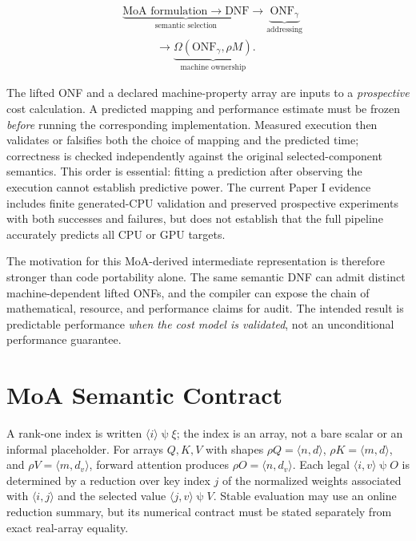 \documentclass[sigplan,10pt,review,balance=false,pbalance=false]{acmart}
\newcommand{\ps}{\mathbin{\psi}}
\begin{document}
\begin{equation}\label{eq:research-chain}
\begin{aligned}
&\underbrace{\text{MoA formulation}\longrightarrow\mathrm{DNF}}_{\text{semantic selection}}
\longrightarrow\underbrace{\mathrm{ONF}_{\gamma}}_{\text{addressing}}\\
&\hspace{3em}\longrightarrow\underbrace{\Omega(\mathrm{ONF}_{\gamma},\rho M)}_{\text{machine ownership}}.
\end{aligned}
\end{equation}

The lifted ONF and a declared machine-property array are inputs to a \emph{prospective} cost calculation. A predicted mapping and performance estimate must be frozen \emph{before} running the corresponding implementation. Measured execution then validates or falsifies both the choice of mapping and the predicted time; correctness is checked independently against the original selected-component semantics. This order is essential: fitting a prediction after observing the execution cannot establish predictive power. The current Paper I evidence includes finite generated-CPU validation and preserved prospective experiments with both successes and failures, but does not establish that the full pipeline accurately predicts all CPU or GPU targets.

The motivation for this MoA-derived intermediate representation is therefore stronger than code portability alone. The same semantic DNF can admit distinct machine-dependent lifted ONFs, and the compiler can expose the chain of mathematical, resource, and performance claims for audit. The intended result is predictable performance \emph{when the cost model is validated}, not an unconditional performance guarantee.

\section{MoA Semantic Contract}
A rank-one index is written $\langle i\rangle\ps\xi$; the index is an array, not a bare scalar or an informal placeholder. For arrays $Q,K,V$ with shapes $\rho Q=\langle n,d\rangle$, $\rho K=\langle m,d\rangle$, and $\rho V=\langle m,d_v\rangle$, forward attention produces $\rho O=\langle n,d_v\rangle$. Each legal $\langle i,v\rangle\ps O$ is determined by a reduction over key index $j$ of the normalized weights associated with $\langle i,j\rangle$ and the selected value $\langle j,v\rangle\ps V$. Stable evaluation may use an online reduction summary, but its numerical contract must be stated separately from exact real-array equality.
\end{document}
